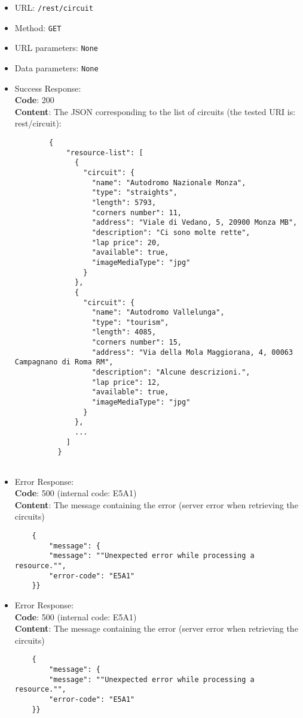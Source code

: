 \begin{itemize}
    \item URL: \texttt{/rest/circuit}
    \item Method: \texttt{GET}
    \item URL parameters: \texttt{None}
    \item Data parameters: \texttt{None}
    \item Success Response: \\
        \textbf{Code}: 200\\
        \textbf{Content}: The JSON corresponding to the list of circuits (the tested URI is: rest/circuit):
	\\\begin{verbatim}
		{
			"resource-list": [
			  {
				"circuit": {
				  "name": "Autodromo Nazionale Monza",
				  "type": "straights",
				  "length": 5793,
				  "corners number": 11,
				  "address": "Viale di Vedano, 5, 20900 Monza MB",
				  "description": "Ci sono molte rette",
				  "lap price": 20,
				  "available": true,
				  "imageMediaType": "jpg"
				}
			  },
			  {
				"circuit": {
				  "name": "Autodromo Vallelunga",
				  "type": "tourism",
				  "length": 4085,
				  "corners number": 15,
				  "address": "Via della Mola Maggiorana, 4, 00063 Campagnano di Roma RM",
				  "description": "Alcune descrizioni.",
				  "lap price": 12,
				  "available": true,
				  "imageMediaType": "jpg"
				}
			  },
			  ...
			]
		  }
		  
	\end{verbatim}
		
    \item Error Response:\\
    \textbf{Code}: 500 (internal code: E5A1)\\
    \textbf{Content}: The message containing the error (server error when retrieving the circuits)\\
    \begin{verbatim}
    {
        "message": {
        "message": ""Unexpected error while processing a resource."",
        "error-code": "E5A1"
    }}
    \end{verbatim}
    \item Error Response:\\
    \textbf{Code}: 500 (internal code: E5A1)\\
    \textbf{Content}: The message containing the error (server error when retrieving the circuits)\\
    \begin{verbatim}
    {
        "message": {
        "message": ""Unexpected error while processing a resource."",
        "error-code": "E5A1"
    }}
    \end{verbatim}
    
\end{itemize}

